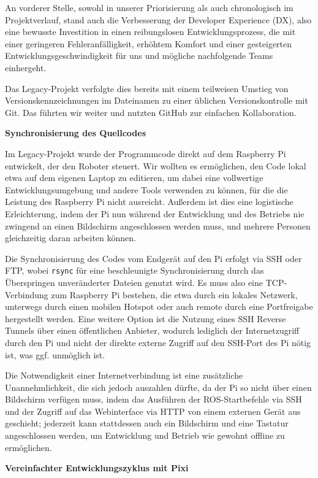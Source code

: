 An vorderer Stelle, sowohl in unserer Priorisierung als auch chronologisch im Projektverlauf, stand auch die Verbesserung der Developer Experience (DX), also eine bewusste Investition in einen reibungslosen Entwicklungsprozess, die mit einer geringeren Fehleranfälligkeit, erhöhtem Komfort und einer gesteigerten Entwicklungsgeschwindigkeit für uns und mögliche nachfolgende Teams einhergeht. 

Das Legacy-Projekt verfolgte dies bereits mit einem teilweisen Umstieg von Versionskennzeichnungen im Dateinamen zu einer üblichen Versionskontrolle mit Git. Das führten wir weiter und nutzten GitHub zur einfachen Kollaboration. 

\textbf{Synchronisierung des Quellcodes}

Im Legacy-Projekt wurde der Programmcode direkt auf dem Raspberry Pi entwickelt, der den Roboter steuert. Wir wollten es ermöglichen, den Code lokal etwa auf dem eigenen Laptop zu editieren, um dabei eine vollwertige Entwicklungsumgebung und andere Tools verwenden zu können, für die die Leistung des Raspberry Pi nicht ausreicht. Außerdem ist dies eine logistische Erleichterung, indem der Pi nun während der Entwicklung und des Betriebs nie zwingend an einen Bildschirm angeschlossen werden muss, und mehrere Personen gleichzeitig daran arbeiten können. 

Die Synchronisierung des Codes vom Endgerät auf den Pi erfolgt via SSH oder FTP, wobei \texttt{rsync} für eine beschleunigte Synchronisierung durch das Überspringen unveränderter Dateien genutzt wird. Es muss also eine TCP-Verbindung zum Raspberry Pi bestehen, die etwa durch ein lokales Netzwerk, unterwegs durch einen mobilen Hotspot oder auch remote durch eine Portfreigabe hergestellt werden. Eine weitere Option ist die Nutzung eines SSH Reverse Tunnels über einen öffentlichen Anbieter, wodurch lediglich der Internetzugriff durch den Pi und nicht der direkte externe Zugriff auf den SSH-Port des Pi nötig ist, was ggf. unmöglich ist. 

Die Notwendigkeit einer Internetverbindung ist eine zusätzliche Unannehmlichkeit, die sich jedoch auszahlen dürfte, da der Pi so nicht über einen Bildschirm verfügen muss, indem das Ausführen der ROS-Startbefehle via SSH und der Zugriff auf das Webinterface via HTTP von einem externen Gerät aus geschieht; jederzeit kann stattdessen auch ein Bildschirm und eine Tastatur angeschlossen werden, um Entwicklung und Betrieb wie gewohnt offline zu ermöglichen. 

\textbf{Vereinfachter Entwicklungszyklus mit Pixi}

